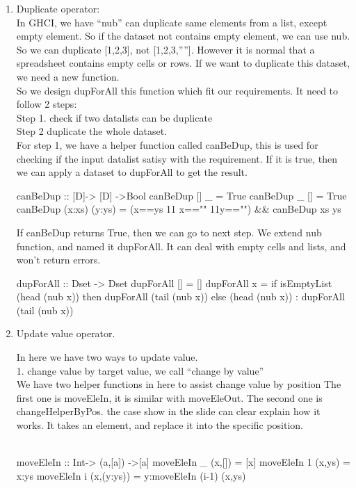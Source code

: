 \documentclass[11pt]{article}
\begin{document}
\begin{enumerate}[(1)]
\item Duplicate operator:\\
In GHCI, we have “nub” can duplicate same elements from a list, except empty element. So if the dataset not contains empty element, we can use nub. So we can duplicate [1,2,3], not [1,2,3,””]. However it is normal that a spreadsheet contains empty cells or rows. If we want to duplicate this dataset, we need a new function. \\So we design dupForAll this function which fit our requirements. It need to follow 2 steps:  \\Step 1. check if two datalists can be duplicate\\ Step 2 duplicate the whole dataset. \\For step 1, we have a helper function called canBeDup, this is used for checking if the input datalist satisy with the requirement. If it is true, then we can apply a dataset to dupForAll to get the result.\\
\begin{program}
canBeDup :: [D]-> [D]  ->Bool 
canBeDup [] _          = True
canBeDup _ []          = True
canBeDup (x:xs) (y:ys) = (x==ys 11 x=="" 11y=="") \&\& canBeDup xs ys
\end{program}
If canBeDup returns True, then we can go to next step. We extend nub function, and named it dupForAll. It can deal with empty cells and lists, and won't return errors.
\begin{program}
dupForAll ::  Dset -> Dset
dupForAll [] = []
dupForAll x  = if isEmptyList (head (nub x)) 
  		 then dupForAll (tail (nub x)) 
 		 else (head (nub x)) : dupForAll (tail (nub x)) 
\end{program}
\item Update value operator.

In here we have two ways to update value. \\1. change value by target value, we call “change by value” \\
We have two helper functions in here to assist change value by position
The first one is moveEleIn, it is similar with moveEleOut. The second one is changeHelperByPos. the case show in the slide can clear explain how it works. It takes an element, and replace it into the specific position.\\
\\
\begin{program}
moveEleIn :: Int-> (a,[a]) ->[a] 
moveEleIn _ (x,[])     = [x] 
moveEleIn 1 (x,ys)     = x:ys 
moveEleIn i (x,(y:ys)) = y:moveEleIn (i-1) (x,ys)


\end{program}
\end{enumerate}
\end{document}

